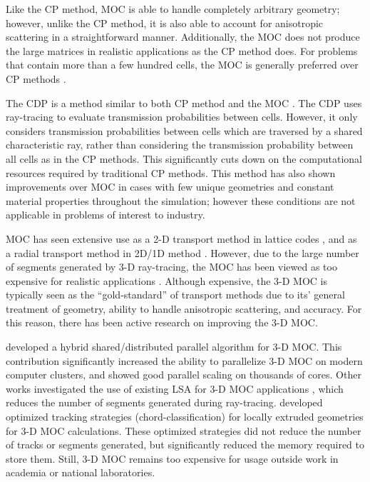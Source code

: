 {{{      Like the \ac{CP} method, \ac{MOC} is able to handle completely arbitrary geometry; however, unlike the \ac{CP} method, it is also able to account for anisotropic scattering in a straightforward manner.
      Additionally, the \ac{MOC} does not produce the large matrices in realistic applications as the \ac{CP} method does.
      For problems that contain more than a few hundred cells, the \ac{MOC} is generally preferred over \ac{CP} methods \cite{Hebert2010}.

      The \ac{CDP} is a method similar to both \ac{CP} method and the \ac{MOC} \cite{Hong1999,Liu2014}.
      The \ac{CDP} uses ray-tracing to evaluate transmission probabilities between cells.
      However, it only considers transmission probabilities between cells which are traversed by a shared characteristic ray, rather than considering the transmission probability between all cells as in the \ac{CP} methods.
      This significantly cuts down on the computational resources required by traditional \ac{CP} methods.
      This method has also shown improvements over \ac{MOC} in cases with few unique geometries and constant material properties throughout the simulation; however these conditions are not applicable in problems of interest to industry.

      \ac{MOC} has seen extensive use as a 2-D transport method in lattice codes \cite{CASMO-4,Ferrer2016}, and as a radial transport method in 2D/1D method \cite{MPACT2016,Collins2016,DeCART,Lee2006}.
      However, due to the large number of segments generated by 3-D ray-tracing, the \ac{MOC} has been viewed as too expensive for realistic applications \cite{Sanchez2012}.
      Although expensive, the 3-D \ac{MOC} is typically seen as the ``gold-standard'' of transport methods due to its' general treatment of geometry, ability to handle anisotropic scattering, and accuracy.
      For this reason, there has been active research on improving the 3-D \ac{MOC}.

      \citet{Kochunas2013} developed a hybrid shared/distributed parallel algorithm for 3-D \ac{MOC}.
      This contribution significantly increased the ability to parallelize 3-D \ac{MOC} on modern computer clusters, and showed good parallel scaling on thousands of cores.
      Other works investigated the use of existing \acf{LSA} for 3-D \ac{MOC} applications \cite{Gunow2018}, which reduces the number of segments generated during ray-tracing.
      \citet{Sciannandrone2016} developed optimized tracking strategies (chord-classification) for locally extruded geometries for 3-D \ac{MOC} calculations.
      These optimized strategies did not reduce the number of tracks or segments generated, but significantly reduced the memory required to store them.
      Still, 3-D \ac{MOC} remains too expensive for usage outside work in academia or national laboratories.

}}}
